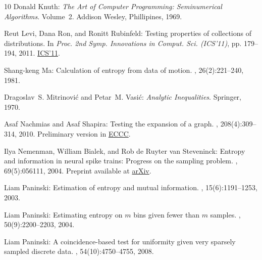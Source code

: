 \begin{thebibliography}{10}
{\sc Donald Knuth}: {\em The Art of Computer Programming: Seminumerical
  Algorithms}.
\newblock Volume~2.
\newblock Addison Wesley, Phillipines, 1969.

{\sc Reut Levi, Dana Ron, and Ronitt Rubinfeld}: Testing properties of
  collections of distributions.
\newblock In {\em Proc. 2nd Symp. Innovations in Comput. Sci. (ICS'11)}, pp.
  179--194, 2011.
\newblock
  \href{http://conference.itcs.tsinghua.edu.cn/ICS2011/content/papers/13.html}{ICS'11}.

{\sc Shang-{keng} Ma}: Calculation of entropy from data of motion.
, 26(2):221--240, 1981.
\newblock [\epfmtdoi{10.1007/BF01013169}]

{\sc Dragoslav~S. Mitrinovi\'{c} and Petar~M. Vasi\'{c}}: {\em Analytic
  Inequalities}.
\newblock Springer, 1970.

{\sc Asaf Nachmias and Asaf Shapira}: Testing the expansion of a graph.
, 208(4):309--314, 2010.
\newblock Preliminary version in
  \href{http://eccc.hpi-web.de/report/2007/118/}{ECCC}.
\newblock [\epfmtdoi{10.1016/j.ic.2009.09.002}]

{\sc Ilya Nemenman, William Bialek, and {Rob de Ruyter van} Steveninck}:
  Entropy and information in neural spike trains: Progress on the sampling
  problem.
, 69(5):056111, 2004.
\newblock Preprint available at
  \href{http://arxiv.org/abs/physics/0306063}{arXiv}.

{\sc Liam Paninski}: Estimation of entropy and mutual information.
, 15(6):1191--1253, 2003.
\newblock [\epfmtdoi{10.1162/089976603321780272}]

{\sc Liam Paninski}: Estimating entropy on $m$ bins given fewer than $m$
  samples.
, 50(9):2200--2203, 2004.

{\sc Liam Paninski}: A coincidence-based test for uniformity given very
  sparsely sampled discrete data.
, 54(10):4750--4755, 2008.


\end{thebibliography}
